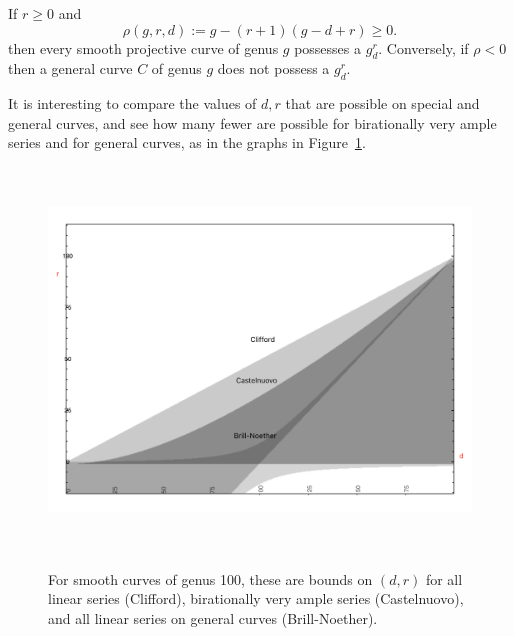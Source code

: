 \begin{theorem}\label{basic BN}
If $r\geq 0$ and
 $$
 \rho(g,r,d) := g - (r+1)(g-d+r) \geq 0.
$$
then every smooth projective curve of genus $g$  possesses a $g^r_d$. Conversely, if $\rho < 0$ then a general curve $C$ of genus $g$ does not possess a $g^r_d$.
\end{theorem}


It is interesting to compare the values of $d,r$ that are possible on special and general curves, and see how many fewer are possible for birationally very ample series and for general curves, as in the graphs in Figure~\ref{Clifford-Castelnuovo-BrillNoether comparison}.

\begin{figure}
\begin{center}
\centerline {\includegraphics[height=4in]{"Clifford-Castelnuovo-Brill-Noether"}}
\caption{For smooth curves of genus 100, 
these are bounds on $(d,r)$ for all linear series (Clifford), 
birationally very ample series (Castelnuovo), and all linear series
on general curves (Brill-Noether). }
\label{Clifford-Castelnuovo-BrillNoether comparison}
\end{center}
\end{figure}


